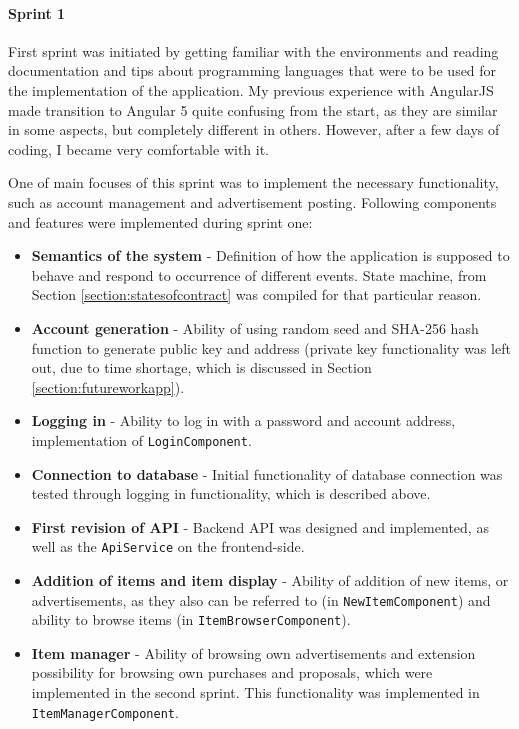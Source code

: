 \paragraph{Sprint 1}
First sprint was initiated by getting familiar with the environments and reading documentation and tips about programming languages that were to be used for the implementation of the application. My previous experience with AngularJS made transition to Angular 5 quite confusing from the start, as they are similar in some aspects, but completely different in others. However, after a few days of coding, I became very comfortable with it.

One of main focuses of this sprint was to implement the necessary functionality, such as account management and advertisement posting. Following components and features were implemented during sprint one:

\begin{itemize}
\item \textbf{Semantics of the system} - Definition of how the application is supposed to behave and respond to occurrence of different events. State machine, from Section \ref{section:statesofcontract} was compiled for that particular reason.

\item \textbf{Account generation} - Ability of using random seed and SHA-256 hash function to generate public key and address (private key functionality was left out, due to time shortage, which is discussed in Section \ref{section:futureworkapp}).

\item \textbf{Logging in} - Ability to log in with a password and account address, implementation of \texttt{LoginComponent}.

\item \textbf{Connection to database} - Initial functionality of database connection was tested through logging in functionality, which is described above.

\item \textbf{First revision of API} - Backend API was designed and implemented, as well as the \texttt{ApiService} on the frontend-side.

\item \textbf{Addition of items and item display} - Ability of addition of new items, or advertisements, as they also can be referred to (in \texttt{NewItemComponent}) and ability to browse items (in \texttt{ItemBrowserComponent}).

\item \textbf{Item manager} - Ability of browsing own advertisements and extension possibility for browsing own purchases and proposals, which were implemented in the second sprint. This functionality was implemented in \texttt{ItemManagerComponent}.
\end{itemize}

